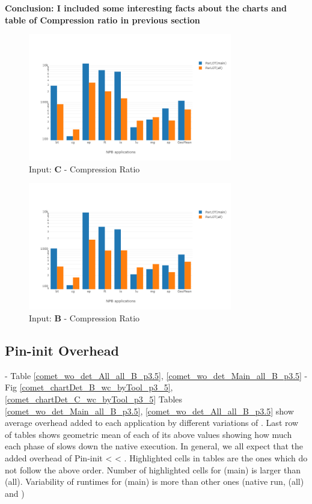 \textbf{Conclusion: I included some interesting facts about the charts and table of Compression ratio in previous section}



\begin{figure}[!t]
\centering
\includegraphics[width=3.5in]{figs.comet.newMed/comet_chartAvg_cr_C_p3_5.png}
\caption{ Input: \textbf{C}  - Compression Ratio
}
\label{comet_chartAvg_cr_C_p3_5}
\end{figure}


\begin{figure}[!t]
\centering
\includegraphics[width=3.5in]{figs.comet.newMed/comet_chartAvg_cr_B_p3_5.png}
\caption{ Input: \textbf{B}  - Compression Ratio
}
\label{comet_chartAvg_cr_B_p3_5}
\end{figure}
  
  
\subsection{Pin-init Overhead} 
\label{subsec:pinit}
 - Table \ref{comet_wo_det_All_all_B_p3.5}, \ref{comet_wo_det_Main_all_B_p3.5}
  - Fig \ref{comet_chartDet_B_wc_byTool_p3_5}, \ref{comet_chartDet_C_wc_byTool_p3_5}
   Tables \ref{comet_wo_det_Main_all_B_p3.5}, \ref{comet_wo_det_All_all_B_p3.5} show average overhead added to each application by different variations of \parlot. Last row of tables shows geometric mean of each of its above values showing how much each phase of \parlot slows down the native execution. In general, we all expect that the added overhead of  Pin-init < \parlot < \parlotnc. Highlighted cells in tables are the ones which do not follow the above order. Number of highlighted cells for \parlot(main) is larger than \parlot(all). Variability of runtimes for \parlot(main) is more than other ones (native run, \parlot(all) and \callgrind) 

